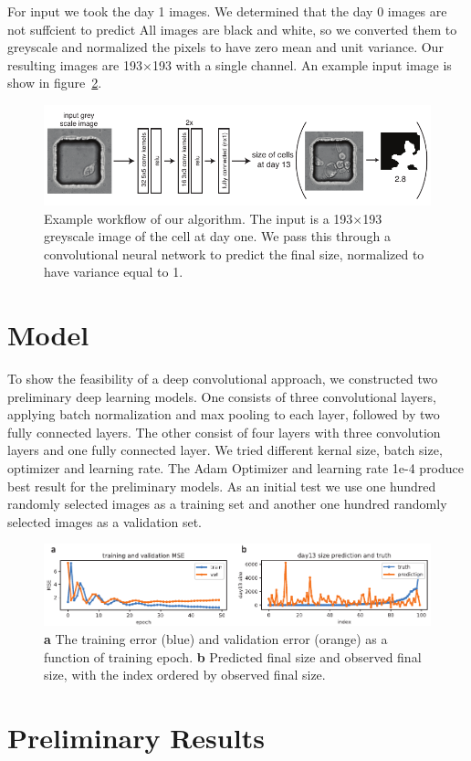 \documentclass[10pt,twocolumn,letterpaper]{article}
\begin{document}
For input we took the day 1 images.  We determined that the day 0 images are not suffcient to predict  All images are black and white, so we converted them to greyscale and normalized the pixels to have zero mean and unit variance.  Our resulting images are 193$\times$193 with a single channel.   An example input image is show in figure~\ref{workflow}.




\begin{figure}[t!]
\begin{center}
 \includegraphics[width=0.8\linewidth]{figures/networkExampleImage.pdf}
\end{center}
   \caption{Example workflow of our algorithm.  The input is a 193$\times$193 greyscale image of the cell at day one.  We pass this through a convolutional neural network to predict the final size, normalized to have variance equal to 1.}
\label{workflow}
\end{figure}

\section{Model}

To show the feasibility of a deep convolutional approach, we constructed two preliminary deep learning models. One consists of three convolutional layers, applying batch normalization and max pooling to each layer, followed by two fully connected layers. The other consist of four layers with three convolution layers and one fully connected layer. We tried different kernal size, batch size, optimizer and learning rate. The Adam Optimizer and learning rate 1e-4 produce best result for the preliminary models.
As an initial test we use one hundred randomly selected images as a training set and another one hundred randomly selected images as a validation set.  


\begin{figure}[t!]
\begin{center}
 \includegraphics[width=0.8\linewidth]{figures/error_vs_epoch_and_validation_predictions_vs_observed.pdf}
\end{center}
   \caption{\textbf{a} The training error (blue) and validation error (orange) as a function of training epoch.  \textbf{b} Predicted final size and observed final size, with the index ordered by observed final size. }
\label{workflow}
\end{figure}



\section{Preliminary Results}



{\small


}
\end{document}
